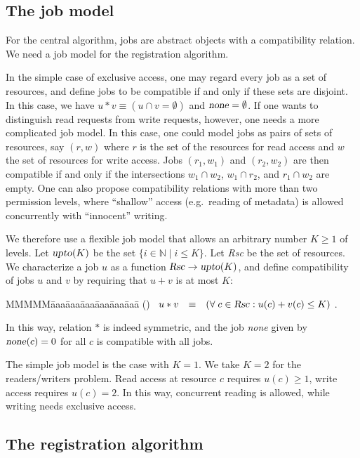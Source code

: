 \documentclass[10pt]{article} \usepackage[english]{babel}
\makeatletter
\def\refmystepcounter#1{\stepcounter{#1}\protect\gdef 
\@currentlabel {\csname p@#1\endcsname \csname 
the#1\endcsname}}
\newcounter {tabnr}
\newenvironment{tabn}{\begin{tabbing}
\refmystepcounter{tabnr}
MMMMM\=aaa\=aaa\=aaa\=aaa\=aaa\=aaa\= \kill
(\arabic{tabnr})~}{\end{tabbing}}
\def\Nat   {\mbox{$\mathbb{N}$}}
\def\all   {\forall\;}
\def\S #1/{\mbox {\textsl{#1}}}
\def\EQ     {\mbox{\quad$\equiv$\quad}}
\makeatother
\begin{document}
\subsection{The job model} \label {jobmodel}

For the central algorithm, jobs are abstract objects with a
compatibility relation. We need a job model for the registration
algorithm.

In the simple case of exclusive access, one may regard every job as a
set of resources, and define jobs to be compatible if and only if
these sets are disjoint.  In this case, we have $u*v \equiv (u\cap v =
\emptyset)$ and $\S none/ = \emptyset$.  If one wants to distinguish
read requests from write requests, however, one needs a more
complicated job model.  In this case, one could model jobs as pairs of
sets of resources, say $(r, w)$ where $r$ is the set of the resources
for read access and $w$ the set of resources for write access.  Jobs
$(r_1, w_1)$ and $(r_2, w_2)$ are then compatible if and only if the
intersections $w_1\cap w_2$, $w_1\cap r_2$, and $r_1\cap w_2$ are
empty.  One can also propose compatibility relations with more than
two permission levels, where ``shallow'' access (e.g.\ reading of
metadata) is allowed concurrently with ``innocent'' writing.

We therefore use a flexible job model that allows an arbitrary number
$K \geq 1$ of levels.  Let $\S upto/(K)$ be the set $\{i\in\Nat\mid i
\leq K\}$.  Let \S Rsc/ be the set of resources. We characterize a job
$u$ as a function $\S Rsc/\to\S upto/(K)$, and define compatibility of
jobs $u$ and $v$ by requiring that $u+v$ is at most $K$:
\begin{tabn} \label{defCompatible}
\> $ u * v \EQ (\all c\in \S Rsc/: u(c) + v(c) \leq K) $ .
\end{tabn}
In this way, relation $*$ is indeed symmetric, and the job \S none/
given by $\S none/(c) = 0$ for all $c$ is compatible with all jobs.

The simple job model is the case with $K=1$.  We take $K=2$ for the
readers/writers problem. Read access at resource $c$ requires $u(c)
\geq 1$, write access requires $u(c) = 2$.  In this way, concurrent
reading is allowed, while writing needs exclusive access.

\subsection{The registration algorithm} \label{queryalg}
\end{document}
